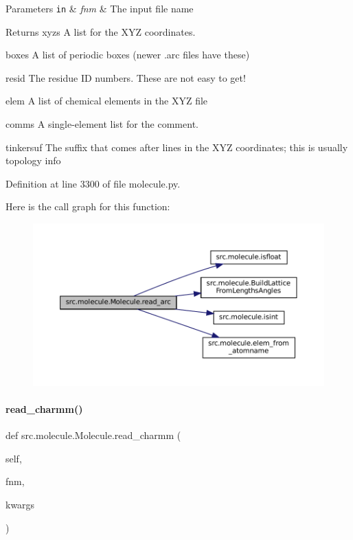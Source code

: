 \begin{DoxyParams}[1]{Parameters}
\mbox{\tt in}  & {\em fnm} & The input file name \\
\hline
\end{DoxyParams}
\begin{DoxyReturn}{Returns}
xyzs A list for the X\+YZ coordinates. 

boxes A list of periodic boxes (newer .arc files have these) 

resid The residue ID numbers. These are not easy to get! 

elem A list of chemical elements in the X\+YZ file 

comms A single-\/element list for the comment. 

tinkersuf The suffix that comes after lines in the X\+YZ coordinates; this is usually topology info 
\end{DoxyReturn}


Definition at line 3300 of file molecule.\+py.

Here is the call graph for this function\+:
\nopagebreak
\begin{figure}[H]
\begin{center}
\leavevmode
\includegraphics[width=350pt]{classsrc_1_1molecule_1_1Molecule_a7e4057a5d9f4bb4a62cef21680f91327_cgraph}
\end{center}
\end{figure}
\mbox{\label{classsrc_1_1molecule_1_1Molecule_a3710f2055a57158a9b5fbab2c5943683}} 
\paragraph{\texorpdfstring{read\+\_\+charmm()}{read\_charmm()}}
{\footnotesize\ttfamily def src.\+molecule.\+Molecule.\+read\+\_\+charmm (\begin{DoxyParamCaption}\item[{}]{self,  }\item[{}]{fnm,  }\item[{}]{kwargs }\end{DoxyParamCaption})}



